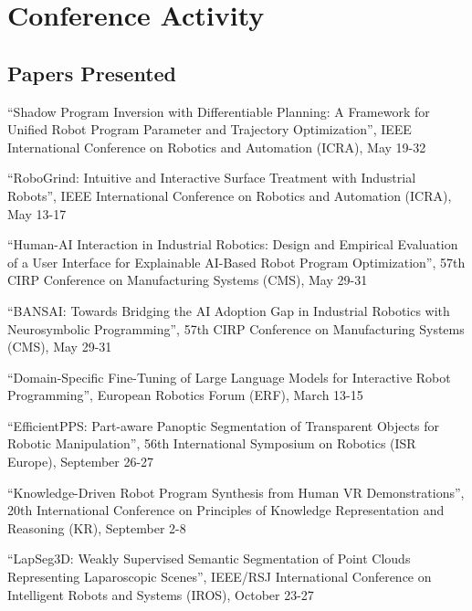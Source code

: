 \documentclass[11pt]{article} %
\begin{document}
\section*{Conference Activity}

\subsection*{Papers Presented}

``Shadow Program Inversion with Differentiable Planning: A Framework for Unified Robot Program Parameter and Trajectory Optimization'', IEEE International Conference on Robotics and Automation (ICRA), May 19-32

\medskip

``RoboGrind: Intuitive and Interactive Surface Treatment with Industrial Robots'', IEEE International Conference on Robotics and Automation (ICRA), May 13-17

\medskip

``Human-AI Interaction in Industrial Robotics: Design and Empirical Evaluation of a User Interface for Explainable AI-Based Robot Program Optimization'', 57th CIRP Conference on Manufacturing Systems (CMS), May 29-31

\medskip

``BANSAI: Towards Bridging the AI Adoption Gap in Industrial Robotics with Neurosymbolic Programming'', 57th CIRP Conference on Manufacturing Systems (CMS), May 29-31

\medskip

``Domain-Specific Fine-Tuning of Large Language Models for Interactive Robot Programming'', European Robotics Forum (ERF), March 13-15

\medskip


``EfficientPPS: Part-aware Panoptic Segmentation of Transparent Objects for Robotic Manipulation'', 56th International Symposium on Robotics (ISR Europe), September 26-27

\medskip

``Knowledge-Driven Robot Program Synthesis from Human VR Demonstrations'', 20th International Conference on Principles of Knowledge Representation and Reasoning (KR), September 2-8

\medskip


``LapSeg3D: Weakly Supervised Semantic Segmentation of Point Clouds Representing Laparoscopic Scenes'', IEEE/RSJ International Conference on Intelligent Robots and Systems (IROS), October 23-27
\end{document}
